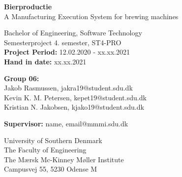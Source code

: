 \begin{titlepage}
\begin{center}
{ \LARGE \bfseries Bierproductie \\[0.4cm]}
A Manufacturing Execution System for brewing machines

Bachelor of Engineering, Software Technology\\
\vspace{2mm}
Semesterproject 4. semester, ST4-PRO\\
\vspace{2mm}
\textbf{Project Period:} 12.02.2020 - xx.xx.2021 \\
\vspace{2mm}
\textbf{Hand in date:} xx.xx.2021 \\

\vspace{7mm}

\textbf{Group 06:} \\
\vspace{2mm}
Jakob Rasmussen, jakra19@student.sdu.dk \\
\vspace{2mm}
Kevin K. M. Petersen, kepet19@student.sdu.dk \\
\vspace{2mm}
Kristian N. Jakobsen, kjako19@student.sdu.dk \\

\vspace{7mm}

\textbf{Supervisor:} name, email@mmmi.sdu.dk \\

\vfill

University of Southern Denmark \\
The Faculty of Engineering \\
The Mærsk Mc-Kinney Møller Institute \\
Campusvej 55, 5230 Odense M 

\end{center}
\end{titlepage}
